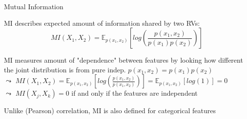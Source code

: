 \documentclass[10pt,compress,t,notes=noshow, xcolor=table]{beamer}
\begin{document}
\begin{frame}[t]{Mutual Information}
\begin{itemizeM}
\item MI describes expected amount of information shared by two RVs:
$$MI(X_1, X_2) = \mathbb{E}_{p(x_1, x_2)} \left[ log\left(\frac{p(x_1, x_2)}{p(x_1) p(x_2)} \right) \right]$$
\item MI measures amount of "dependence" between features by looking how different the joint distribution is from pure indep. $p(x_1, x_2) = p(x_1) p(x_2)$\\
$\leadsto$ $MI(X_1, X_2) = \mathbb{E}_{p(x_1, x_2)} \left[ log\left(\frac{p(x_1, x_2)}{p(x_1, x_2)} \right) \right] = \mathbb{E}_{p(x_1, x_2)} \left[ log(1) \right] = 0$\\
$\leadsto$ $MI(X_j, X_k) = 0$ if and only if the features are independent
\item Unlike (Pearson) correlation, MI is also defined for categorical features
\end{itemizeM}
\end{frame}
\end{document}
